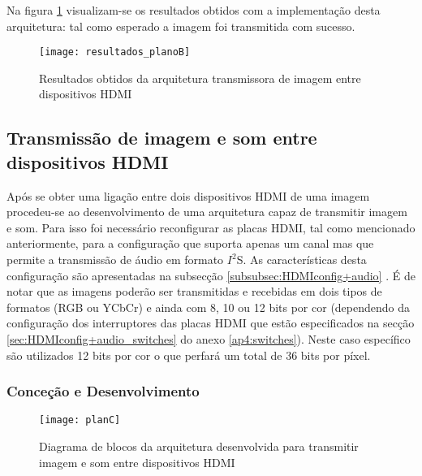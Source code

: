 Na figura \ref{fig:resultados_planoB} visualizam-se os resultados obtidos com a implementação desta arquitetura: tal como esperado a imagem foi transmitida com sucesso.

\begin{figure}[h!]
	\begin{center}
		\leavevmode
		\texttt{[image: resultados\_planoB]}
		\caption{Resultados obtidos da arquitetura transmissora de imagem entre dispositivos HDMI}
		\label{fig:resultados_planoB}
	\end{center}
\end{figure}

\begin{center}
\end{center}


\subsection{Transmissão de imagem e som entre dispositivos HDMI}

Após se obter uma ligação entre dois dispositivos HDMI de uma imagem procedeu-se ao desenvolvimento de uma arquitetura capaz de transmitir imagem e som. Para isso foi necessário reconfigurar as placas HDMI, tal como mencionado anteriormente, para a configuração que suporta apenas um canal mas que permite a transmissão de áudio em formato $I^{2}$S. As características desta configuração são apresentadas na subsecção \ref{subsubsec:HDMIconfig+audio} . É de notar que as imagens poderão ser transmitidas e recebidas em dois tipos de formatos (RGB ou YCbCr) e ainda com 8, 10 ou 12 bits por cor (dependendo da configuração dos interruptores das placas HDMI que estão especificados na secção \ref{sec:HDMIconfig+audio_switches} do anexo \ref{ap4:switches}). Neste caso específico são utilizados 12 bits por cor o que perfará um total de 36 bits por píxel.

\subsubsection*{Conceção e Desenvolvimento}

\begin{figure}[h!]
	\begin{center}
		\leavevmode
		\texttt{[image: planC]}
		\caption{Diagrama de blocos da arquitetura desenvolvida para transmitir imagem e som entre dispositivos HDMI}
		\label{fig:planC}
	\end{center}
\end{figure}


